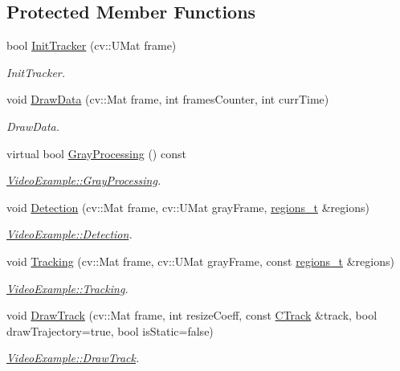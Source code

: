 \subsection*{Protected Member Functions}
\begin{DoxyCompactItemize}
\item 
bool \mbox{\hyperlink{class_face_detector_example_a605d06dff8405d78a99ef3c383e88ad5}{Init\+Tracker}} (cv\+::\+U\+Mat frame)
\begin{DoxyCompactList}\small\item\em Init\+Tracker. \end{DoxyCompactList}\item 
void \mbox{\hyperlink{class_face_detector_example_a13af0e89b24ef94ac5f5249ff387d40a}{Draw\+Data}} (cv\+::\+Mat frame, int frames\+Counter, int curr\+Time)
\begin{DoxyCompactList}\small\item\em Draw\+Data. \end{DoxyCompactList}\item 
virtual bool \mbox{\hyperlink{class_video_example_af8ea44f17711129d2b954d1f01fee1f0}{Gray\+Processing}} () const
\begin{DoxyCompactList}\small\item\em \mbox{\hyperlink{class_video_example_af8ea44f17711129d2b954d1f01fee1f0}{Video\+Example\+::\+Gray\+Processing}}. \end{DoxyCompactList}\item 
void \mbox{\hyperlink{class_video_example_a5ea4a212997371399b01aed1d59a80b8}{Detection}} (cv\+::\+Mat frame, cv\+::\+U\+Mat gray\+Frame, \mbox{\hyperlink{defines_8h_a01db0de56a20f4342820a093c5154536}{regions\+\_\+t}} \&regions)
\begin{DoxyCompactList}\small\item\em \mbox{\hyperlink{class_video_example_a5ea4a212997371399b01aed1d59a80b8}{Video\+Example\+::\+Detection}}. \end{DoxyCompactList}\item 
void \mbox{\hyperlink{class_video_example_af412482dcaad532d958dc31b362ee1c2}{Tracking}} (cv\+::\+Mat frame, cv\+::\+U\+Mat gray\+Frame, const \mbox{\hyperlink{defines_8h_a01db0de56a20f4342820a093c5154536}{regions\+\_\+t}} \&regions)
\begin{DoxyCompactList}\small\item\em \mbox{\hyperlink{class_video_example_af412482dcaad532d958dc31b362ee1c2}{Video\+Example\+::\+Tracking}}. \end{DoxyCompactList}\item 
void \mbox{\hyperlink{class_video_example_a84a040bc87b915c5ee18c5d11235f40c}{Draw\+Track}} (cv\+::\+Mat frame, int resize\+Coeff, const \mbox{\hyperlink{class_c_track}{C\+Track}} \&track, bool draw\+Trajectory=true, bool is\+Static=false)
\begin{DoxyCompactList}\small\item\em \mbox{\hyperlink{class_video_example_a84a040bc87b915c5ee18c5d11235f40c}{Video\+Example\+::\+Draw\+Track}}. \end{DoxyCompactList}\end{DoxyCompactItemize}
